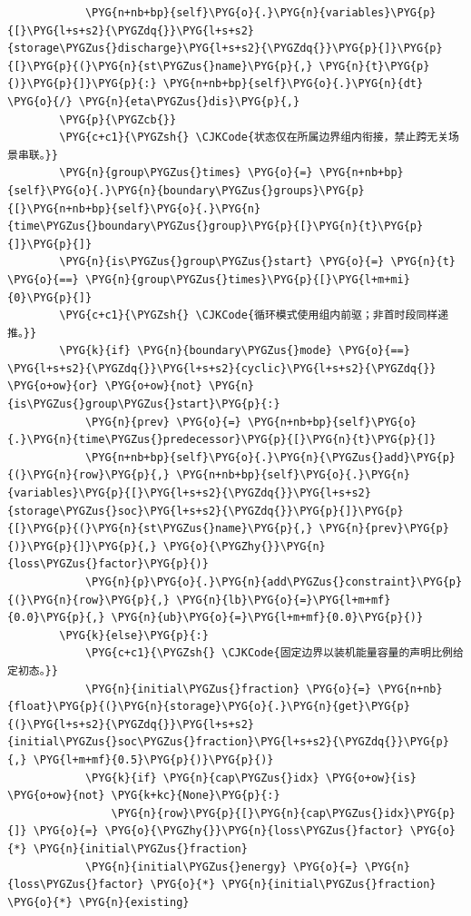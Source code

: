 \begin{Verbatim}
            \PYG{n+nb+bp}{self}\PYG{o}{.}\PYG{n}{variables}\PYG{p}{[}\PYG{l+s+s2}{\PYGZdq{}}\PYG{l+s+s2}{storage\PYGZus{}discharge}\PYG{l+s+s2}{\PYGZdq{}}\PYG{p}{]}\PYG{p}{[}\PYG{p}{(}\PYG{n}{st\PYGZus{}name}\PYG{p}{,} \PYG{n}{t}\PYG{p}{)}\PYG{p}{]}\PYG{p}{:} \PYG{n+nb+bp}{self}\PYG{o}{.}\PYG{n}{dt} \PYG{o}{/} \PYG{n}{eta\PYGZus{}dis}\PYG{p}{,}
        \PYG{p}{\PYGZcb{}}
        \PYG{c+c1}{\PYGZsh{} \CJKCode{状态仅在所属边界组内衔接，禁止跨无关场景串联。}}
        \PYG{n}{group\PYGZus{}times} \PYG{o}{=} \PYG{n+nb+bp}{self}\PYG{o}{.}\PYG{n}{boundary\PYGZus{}groups}\PYG{p}{[}\PYG{n+nb+bp}{self}\PYG{o}{.}\PYG{n}{time\PYGZus{}boundary\PYGZus{}group}\PYG{p}{[}\PYG{n}{t}\PYG{p}{]}\PYG{p}{]}
        \PYG{n}{is\PYGZus{}group\PYGZus{}start} \PYG{o}{=} \PYG{n}{t} \PYG{o}{==} \PYG{n}{group\PYGZus{}times}\PYG{p}{[}\PYG{l+m+mi}{0}\PYG{p}{]}
        \PYG{c+c1}{\PYGZsh{} \CJKCode{循环模式使用组内前驱；非首时段同样递推。}}
        \PYG{k}{if} \PYG{n}{boundary\PYGZus{}mode} \PYG{o}{==} \PYG{l+s+s2}{\PYGZdq{}}\PYG{l+s+s2}{cyclic}\PYG{l+s+s2}{\PYGZdq{}} \PYG{o+ow}{or} \PYG{o+ow}{not} \PYG{n}{is\PYGZus{}group\PYGZus{}start}\PYG{p}{:}
            \PYG{n}{prev} \PYG{o}{=} \PYG{n+nb+bp}{self}\PYG{o}{.}\PYG{n}{time\PYGZus{}predecessor}\PYG{p}{[}\PYG{n}{t}\PYG{p}{]}
            \PYG{n+nb+bp}{self}\PYG{o}{.}\PYG{n}{\PYGZus{}add}\PYG{p}{(}\PYG{n}{row}\PYG{p}{,} \PYG{n+nb+bp}{self}\PYG{o}{.}\PYG{n}{variables}\PYG{p}{[}\PYG{l+s+s2}{\PYGZdq{}}\PYG{l+s+s2}{storage\PYGZus{}soc}\PYG{l+s+s2}{\PYGZdq{}}\PYG{p}{]}\PYG{p}{[}\PYG{p}{(}\PYG{n}{st\PYGZus{}name}\PYG{p}{,} \PYG{n}{prev}\PYG{p}{)}\PYG{p}{]}\PYG{p}{,} \PYG{o}{\PYGZhy{}}\PYG{n}{loss\PYGZus{}factor}\PYG{p}{)}
            \PYG{n}{p}\PYG{o}{.}\PYG{n}{add\PYGZus{}constraint}\PYG{p}{(}\PYG{n}{row}\PYG{p}{,} \PYG{n}{lb}\PYG{o}{=}\PYG{l+m+mf}{0.0}\PYG{p}{,} \PYG{n}{ub}\PYG{o}{=}\PYG{l+m+mf}{0.0}\PYG{p}{)}
        \PYG{k}{else}\PYG{p}{:}
            \PYG{c+c1}{\PYGZsh{} \CJKCode{固定边界以装机能量容量的声明比例给定初态。}}
            \PYG{n}{initial\PYGZus{}fraction} \PYG{o}{=} \PYG{n+nb}{float}\PYG{p}{(}\PYG{n}{storage}\PYG{o}{.}\PYG{n}{get}\PYG{p}{(}\PYG{l+s+s2}{\PYGZdq{}}\PYG{l+s+s2}{initial\PYGZus{}soc\PYGZus{}fraction}\PYG{l+s+s2}{\PYGZdq{}}\PYG{p}{,} \PYG{l+m+mf}{0.5}\PYG{p}{)}\PYG{p}{)}
            \PYG{k}{if} \PYG{n}{cap\PYGZus{}idx} \PYG{o+ow}{is} \PYG{o+ow}{not} \PYG{k+kc}{None}\PYG{p}{:}
                \PYG{n}{row}\PYG{p}{[}\PYG{n}{cap\PYGZus{}idx}\PYG{p}{]} \PYG{o}{=} \PYG{o}{\PYGZhy{}}\PYG{n}{loss\PYGZus{}factor} \PYG{o}{*} \PYG{n}{initial\PYGZus{}fraction}
            \PYG{n}{initial\PYGZus{}energy} \PYG{o}{=} \PYG{n}{loss\PYGZus{}factor} \PYG{o}{*} \PYG{n}{initial\PYGZus{}fraction} \PYG{o}{*} \PYG{n}{existing}

\end{Verbatim}
